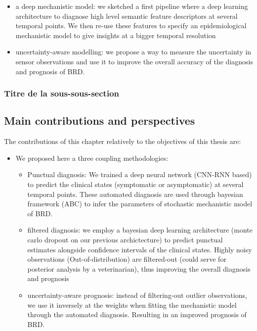 \begin{itemize}
    \item a deep mechanistic model: we sketched a first pipeline where a deep learning architecture to diagnose high level semantic feature descriptors at several temporal points. We then re-use these features to specify an epidemiological mechanistic model to give insights at a bigger temporal resolution  
    \item uncertainty-aware modelling: we propose a way to measure the uncertainty in sensor observations and use it to improve the overall accuracy of the diagnosis and prognosis of BRD.
\end{itemize}



\subsubsection{Titre de la sous-sous-section}

\subsection{Main contributions and perspectives}

The contributions of this chapter relatively to the objectives of this thesis are:

\begin{itemize}
    \item We proposed here a three coupling methodologies:
        \begin{itemize}
            \item Punctual diagnosis: We trained a deep neural network (CNN-RNN based) to predict the clinical states (symptomatic or asymptomatic) at several temporal points. These automated diagnosis are used through bayesian framework (ABC) to infer the parameters of stochastic mechanistic model of BRD.   
            \item filtered diagnosis: we employ a bayesian deep learning architecture (monte carlo dropout on our previous archictecture) to predict punctual estimates alongside confidence intervals of the clinical states. Highly noisy observations (Out-of-distribution) are filtered-out (could serve for posterior analysis by a veterinarian), thus improving the overall diagnosis and prognosis
            \item uncertainty-aware prognosis: instead of filtering-out outlier observations, we use it inversely at the weights when fitting the mechanistic model through the automated diagnosis. Resulting in an improved prognosis of BRD.
        \end{itemize}
\end{itemize}

